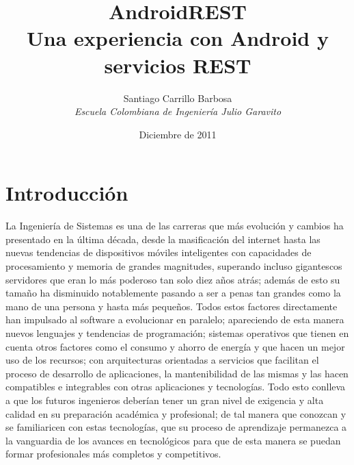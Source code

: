 \documentclass[letterpaper,12pt]{book}
\newcommand{\fnz}{\footnotesize}
\begin{document}

\nocite{*}


\begin{frontmatter}
  \begin{titlepage}
    \title{AndroidREST\\
            Una experiencia con Android y servicios REST\\[3cm]}



    \author{\textsf{Santiago Carrillo Barbosa}\\\textit{Escuela Colombiana de Ingeniería Julio Garavito}\\[10cm]}



    \date{Diciembre de 2011}
    \maketitle
  \end{titlepage}
		
   \tableofcontents

\chapter{Introducción}
 \lhead[\fancyplain{}{}]
       {\fancyplain{}{\fnz{Introducción}}}
 \rhead[\fancyplain{}{\fnz{Introducción}}]
       {\fancyplain{}{}}

La Ingeniería de  Sistemas es una de las carreras  que más evolución y
cambios ha presentado  en la última década, desde  la masificación del
internet   hasta  las  nuevas   tendencias  de   dispositivos  móviles
inteligentes  con capacidades  de procesamiento  y memoria  de grandes
magnitudes, superando  incluso gigantescos servidores que  eran lo más
poderoso  tan  solo diez  años  atrás; además  de  esto  su tamaño  ha
disminuido notablemente pasando a ser a penas tan grandes como la mano
de una persona y hasta más pequeños. Todos estos factores directamente
han impulsado  al software a  evolucionar en paralelo;  apareciendo de
esta manera  nuevos lenguajes  y tendencias de  programación; sistemas
operativos  que tienen  en cuenta  otros  factores como  el consumo  y
ahorro  de energía  y que  hacen  un mejor  uso de  los recursos;  con
arquitecturas  orientadas  a servicios  que  facilitan  el proceso  de
desarrollo  de aplicaciones,  la mantenibilidad  de las  mismas  y las
hacen   compatibles   e   integrables   con   otras   aplicaciones   y
tecnologías. Todo esto conlleva  a que los futuros ingenieros deberían
tener  un gran nivel  de exigencia  y alta  calidad en  su preparación
académica y profesional; de tal  manera que conozcan y se familiaricen
con estas tecnologías,  que su proceso de aprendizaje  permanezca a la
vanguardia de los  avances en tecnológicos para que  de esta manera se
puedan formar profesionales más completos y competitivos.


\end{frontmatter}
\end{document}
